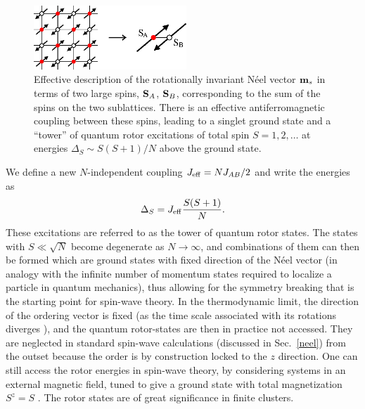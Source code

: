 \documentclass[draft,numberedheadings]{aipproc}
\begin{document}
\begin{figure}
\includegraphics[width=5.75cm, clip]{abspins.eps}
\caption{Effective description of the rotationally invariant N\'eel vector ${\bf m}_s$ in terms of two large spins, ${\bf S}_A$, ${\bf S}_B$, corresponding to 
the sum of the spins on the two sublattices. There is an effective antiferromagnetic coupling between these spins, leading to a singlet ground state and a 
``tower'' of quantum rotor excitations of total spin $S=1,2,\ldots$ at energies $\Delta_S \sim S(S+1)/N$ above the ground state.}
\label{abspins}
\end{figure}

We define a new $N$-independent coupling $J_{\rm eff}=NJ_{AB}/2$ and write the energies as
\begin{equation}
\Delta_S=J_{\rm eff}\frac{S(S+1)}{N}.
\label{estower1}
\end{equation}
These excitations are referred to as the tower of quantum rotor states. The states with $S\ll \sqrt{N}$ become degenerate as $N \to \infty$, and combinations 
of them can then be formed which are ground states with fixed direction of the N\'eel vector (in analogy with the infinite number of momentum states required
to localize a particle in quantum mechanics), thus allowing for the symmetry breaking that is the starting point for spin-wave theory. In the 
thermodynamic limit, the direction of the ordering vector is fixed (as the time scale associated with its rotations diverges \cite{anderson59}), and the 
quantum rotor-states are then in practice not accessed. They are neglected in standard spin-wave calculations (discussed in Sec.~\ref{neel}) from the outset 
because the order is by construction locked to the $z$ direction. One can still access the rotor energies in spin-wave theory, by considering systems in 
an external magnetic field, tuned to give a ground state with total magnetization $S^z=S$ \cite{oguchi,lavalle}. The rotor states are of great significance 
in finite clusters.
\end{document}

